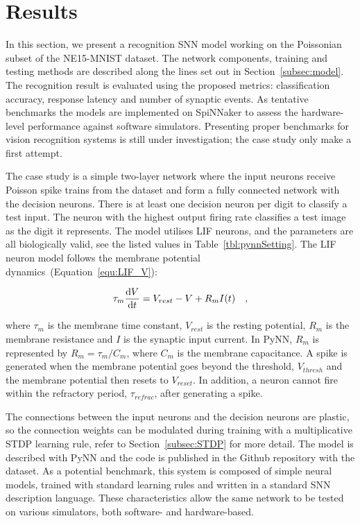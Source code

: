 \section{Results}
\label{sec:test}
In this section, we present a recognition SNN model working on the Poissonian subset of the NE15-MNIST dataset.
The network components, training and testing methods are described along the lines set out in Section~\ref{subsec:model}.
The recognition result is evaluated using the proposed metrics: classification accuracy, response latency and number of synaptic events.
As tentative benchmarks the models are implemented on SpiNNaker to assess the hardware-level performance against software simulators.
Presenting proper benchmarks for vision recognition systems is still under investigation; the case study only make a first attempt.

The case study is a simple two-layer network where the input neurons receive Poisson spike trains from the dataset and form a fully connected network with the decision neurons.
There is at least one decision neuron per digit to classify a test input.
The neuron with the highest output firing rate classifies a test image as the digit it represents.
The model utilises LIF neurons, and the parameters are all biologically valid, see the listed values in Table~\ref{tbl:pynnSetting}.
The LIF neuron model follows the membrane potential dynamics~(Equation~\ref{equ:LIF_V}):

\begin{equation}
\tau_m \frac{\mathrm{d} V}{\mathrm{d} t}=V_{rest} - V + R_{m} I(t) ~~~,
\label{eq:LIF}
\end{equation}

where $\tau_m$ is the membrane time constant, $ V_{rest} $ is the resting potential, $ R_{m} $ is the membrane resistance and $ I $ is the synaptic input current.
In PyNN, $ R_{m} $ is represented by $ R_{m}=\tau_m/C_{m} $, where $C_{m} $ is the membrane capacitance.
A spike is generated when the membrane potential goes beyond the threshold, $ V_{thresh} $ and the membrane potential then resets to $V_{reset}$.
In addition, a neuron cannot fire within the refractory period, $ \tau_{refrac} $, after generating a spike.

The connections between the input neurons and the decision neurons are plastic, so the connection weights can be modulated during training with a multiplicative STDP learning rule, refer to Section~\ref{subsec:STDP} for more detail.
The model is described with PyNN and the code is published in
the Github repository with the dataset.
As a potential benchmark, this system is composed of simple neural models, trained with standard learning rules and written in a standard SNN description language. These characteristics allow the same network to be tested on various simulators, both software- and hardware-based.

